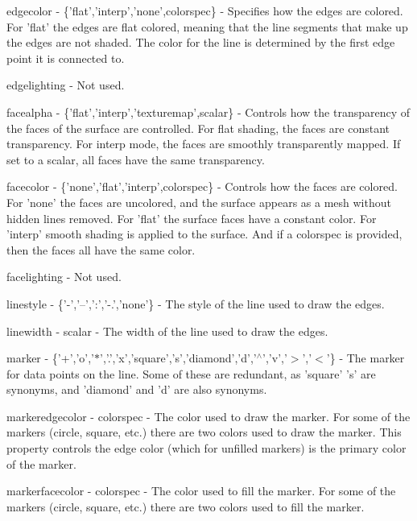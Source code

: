 \begin{DoxyItemize}
\item {\ttfamily edgecolor} -\/ {\ttfamily \{'flat','interp','none',colorspec\}} -\/ Specifies how the edges are colored. For {\ttfamily 'flat'} the edges are flat colored, meaning that the line segments that make up the edges are not shaded. The color for the line is determined by the first edge point it is connected to.  
\item {\ttfamily edgelighting} -\/ Not used.  
\item {\ttfamily facealpha} -\/ {\ttfamily \{'flat','interp','texturemap',scalar\}} -\/ Controls how the transparency of the faces of the surface are controlled. For flat shading, the faces are constant transparency. For interp mode, the faces are smoothly transparently mapped. If set to a scalar, all faces have the same transparency.  
\item {\ttfamily facecolor} -\/ {\ttfamily \{'none','flat','interp',colorspec\}} -\/ Controls how the faces are colored. For {\ttfamily 'none'} the faces are uncolored, and the surface appears as a mesh without hidden lines removed. For {\ttfamily 'flat'} the surface faces have a constant color. For {\ttfamily 'interp'} smooth shading is applied to the surface. And if a colorspec is provided, then the faces all have the same color.  
\item {\ttfamily facelighting} -\/ Not used.  
\item {\ttfamily linestyle} -\/ {\ttfamily \{'-\/','--','\-:','-\/.','none'\}} -\/ The style of the line used to draw the edges.  
\item {\ttfamily linewidth} -\/ {\ttfamily scalar} -\/ The width of the line used to draw the edges.  
\item {\ttfamily marker} -\/ {\ttfamily \{'+','o','$\ast$','.','x','square','s','diamond','d','$^\wedge$','v','$>$','$<$'\}} -\/ The marker for data points on the line. Some of these are redundant, as {\ttfamily 'square'} {\ttfamily 's'} are synonyms, and {\ttfamily 'diamond'} and {\ttfamily 'd'} are also synonyms.  
\item {\ttfamily markeredgecolor} -\/ {\ttfamily colorspec} -\/ The color used to draw the marker. For some of the markers (circle, square, etc.) there are two colors used to draw the marker. This property controls the edge color (which for unfilled markers) is the primary color of the marker.  
\item {\ttfamily markerfacecolor} -\/ {\ttfamily colorspec} -\/ The color used to fill the marker. For some of the markers (circle, square, etc.) there are two colors used to fill the marker.  

\end{DoxyItemize}
